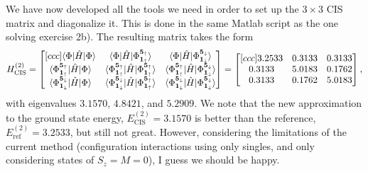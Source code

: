 \documentclass[a4paper]{article}
\newcommand{\bmat}[2]{\begin{bmatrix}[#1] #2 \end{bmatrix}}  %
\renewcommand{\u}[1]{{\bf #1}_\uparrow}
\renewcommand{\d}[1]{{\bf #1}_\downarrow}
\begin{document}
We have now developed all the tools we need in order to set up the $3\times3$ CIS matrix and diagonalize it. This is done in the same {\sc Matlab} script as the one solving exercise 2b). The resulting matrix takes the form
\begin{align}
H_\text{CIS}^{(2)}=\bmat{ccc}{\langle \Phi | \hat{H} | \Phi \rangle & \langle \Phi | \hat{H} | \Phi^{\u{5}}_{\u{1}} \rangle & \langle \Phi | \hat{H} | \Phi^{\d{5}}_{\d{1}} \rangle \\
\langle \Phi^{\u{5}}_{\u{1}} | \hat{H} | \Phi \rangle & \langle \Phi^{\u{5}}_{\u{1}} | \hat{H} | \Phi^{\u{5}}_{\u{1}} \rangle & \langle \Phi^{\u{5}}_{\u{1}} | \hat{H} | \Phi^{\d{5}}_{\d{1}} \rangle \\
\langle \Phi^{\d{5}}_{\d{1}} | \hat{H} | \Phi \rangle & \langle \Phi^{\d{5}}_{\d{1}} | \hat{H} | \Phi^{\u{5}}_{\u{1}} \rangle & \langle \Phi^{\d{5}}_{\d{1}} | \hat{H} | \Phi^{\d{5}}_{\d{1}} \rangle} = \bmat{ccc}{3.2533 & 0.3133 & 0.3133 \\
0.3133 & 5.0183 & 0.1762\\
0.3133 & 0.1762 & 5.0183},
\end{align}
with eigenvalues $3.1570$, $4.8421$, and $5.2909$. We note that the new approximation to the ground state energy, $E_\text{CIS}^{(2)}=3.1570$ is better than the reference, $E_\text{ref}^{(2)}=3.2533$, but still not great. However, considering the limitations of the current method (configuration interactions using only singles, and only considering states of $S_z=M=0$), I guess we should be happy.
\end{document}
